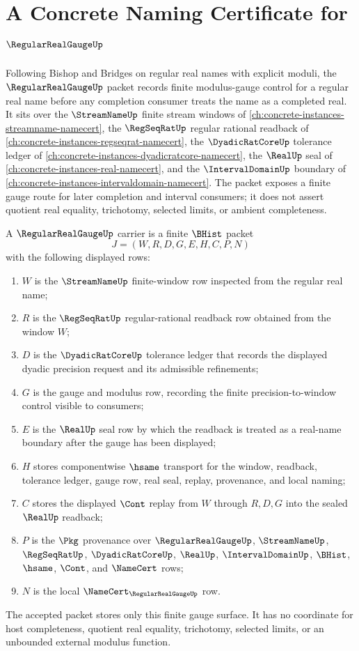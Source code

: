 \chapter{A Concrete Naming Certificate for $\RegularRealGaugeUp$}
\label{ch:concrete-instances-regular-real-gauge-namecert}

Following Bishop and Bridges on regular real names with explicit moduli, the $\RegularRealGaugeUp$ packet records finite modulus-gauge control for a regular real name before any completion consumer treats the name as a completed real. It sits over the $\StreamNameUp$ finite stream windows of \autoref{ch:concrete-instances-streamname-namecert}, the $\RegSeqRatUp$ regular rational readback of \autoref{ch:concrete-instances-regseqrat-namecert}, the $\DyadicRatCoreUp$ tolerance ledger of \autoref{ch:concrete-instances-dyadicratcore-namecert}, the $\RealUp$ seal of \autoref{ch:concrete-instances-real-namecert}, and the $\IntervalDomainUp$ boundary of \autoref{ch:concrete-instances-intervaldomain-namecert}. The packet exposes a finite gauge route for later completion and interval consumers; it does not assert quotient real equality, trichotomy, selected limits, or ambient completeness.

\begin{definition}
\label{def:regular-real-gauge-carrier}
A $\RegularRealGaugeUp$ carrier is a finite $\BHist$ packet
$$
J=(W,R,D,G,E,H,C,P,N)
$$
with the following displayed rows:
\begin{enumerate}
\item $W$ is the $\StreamNameUp$ finite-window row inspected from the regular real name;
\item $R$ is the $\RegSeqRatUp$ regular-rational readback row obtained from the window $W$;
\item $D$ is the $\DyadicRatCoreUp$ tolerance ledger that records the displayed dyadic precision request and its admissible refinements;
\item $G$ is the gauge and modulus row, recording the finite precision-to-window control visible to consumers;
\item $E$ is the $\RealUp$ seal row by which the readback is treated as a real-name boundary after the gauge has been displayed;
\item $H$ stores componentwise $\hsame$ transport for the window, readback, tolerance ledger, gauge row, real seal, replay, provenance, and local naming;
\item $C$ stores the displayed $\Cont$ replay from $W$ through $R,D,G$ into the sealed $\RealUp$ readback;
\item $P$ is the $\Pkg$ provenance over $\RegularRealGaugeUp$, $\StreamNameUp$, $\RegSeqRatUp$, $\DyadicRatCoreUp$, $\RealUp$, $\IntervalDomainUp$, $\BHist$, $\hsame$, $\Cont$, and $\NameCert$ rows;
\item $N$ is the local $\NameCert_{\RegularRealGaugeUp}$ row.
\end{enumerate}
The accepted packet stores only this finite gauge surface. It has no coordinate for host completeness, quotient real equality, trichotomy, selected limits, or an unbounded external modulus function.
\end{definition}


